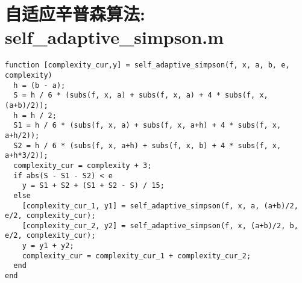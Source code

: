 \section*{自适应辛普森算法: self\_adaptive\_simpson.m}
\lstset{language=Matlab}
\begin{lstlisting}
function [complexity_cur,y] = self_adaptive_simpson(f, x, a, b, e, complexity)
  h = (b - a);
  S = h / 6 * (subs(f, x, a) + subs(f, x, a) + 4 * subs(f, x, (a+b)/2));
  h = h / 2;
  S1 = h / 6 * (subs(f, x, a) + subs(f, x, a+h) + 4 * subs(f, x, a+h/2));
  S2 = h / 6 * (subs(f, x, a+h) + subs(f, x, b) + 4 * subs(f, x, a+h*3/2));
  complexity_cur = complexity + 3;
  if abs(S - S1 - S2) < e
    y = S1 + S2 + (S1 + S2 - S) / 15;
  else 
    [complexity_cur_1, y1] = self_adaptive_simpson(f, x, a, (a+b)/2, e/2, complexity_cur);
    [complexity_cur_2, y2] = self_adaptive_simpson(f, x, (a+b)/2, b, e/2, complexity_cur);
    y = y1 + y2;
    complexity_cur = complexity_cur_1 + complexity_cur_2;
  end
end
\end{lstlisting}

